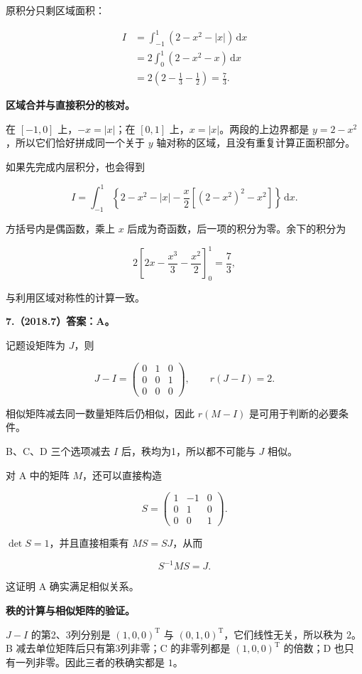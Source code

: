 \documentclass[UTF8,11pt,fontset=windows]{ctexart}
\begin{document}
原积分只剩区域面积：

$$
\begin{aligned}
I&=\int_{-1}^1(2-x^2-|x|)\,\mathrm dx\\
&=2\int_0^1(2-x^2-x)\,\mathrm dx\\
&=2\left(2-\frac13-\frac12\right)=\frac73.
\end{aligned}
$$

\textbf{区域合并与直接积分的核对。}

在 $[-1,0]$ 上，$-x=|x|$；在 $[0,1]$ 上，$x=|x|$。两段的上边界都是 $y=2-x^2$，所以它们恰好拼成同一个关于 $y$ 轴对称的区域，且没有重复计算正面积部分。

如果先完成内层积分，也会得到

$$
I=\int_{-1}^{1}\left\{2-x^2-|x|-\frac{x}{2}\left[(2-x^2)^2-x^2\right]\right\}\,\mathrm dx.
$$

方括号内是偶函数，乘上 $x$ 后成为奇函数，后一项的积分为零。余下的积分为

$$
2\left[2x-\frac{x^3}{3}-\frac{x^2}{2}\right]_0^1=\frac73,
$$

与利用区域对称性的计算一致。

\clearpage

\textbf{7.（2018.7）答案：A。}

记题设矩阵为 $J$，则

$$
J-I=\begin{pmatrix}0&1&0\\0&0&1\\0&0&0\end{pmatrix},
\qquad r(J-I)=2.
$$

相似矩阵减去同一数量矩阵后仍相似，因此 $r(M-I)$ 是可用于判断的必要条件。

B、C、D 三个选项减去 $I$ 后，秩均为1，所以都不可能与 $J$ 相似。

对 A 中的矩阵 $M$，还可以直接构造

$$
S=\begin{pmatrix}1&-1&0\\0&1&0\\0&0&1\end{pmatrix}.
$$

$\det S=1$，并且直接相乘有 $MS=SJ$，从而

$$
S^{-1}MS=J.
$$

这证明 A 确实满足相似关系。

\textbf{秩的计算与相似矩阵的验证。}

$J-I$ 的第2、3列分别是 $(1,0,0)^{\mathrm T}$ 与 $(0,1,0)^{\mathrm T}$，它们线性无关，所以秩为 $2$。B 减去单位矩阵后只有第3列非零；C 的非零列都是 $(1,0,0)^{\mathrm T}$ 的倍数；D 也只有一列非零。因此三者的秩确实都是 $1$。
\end{document}
